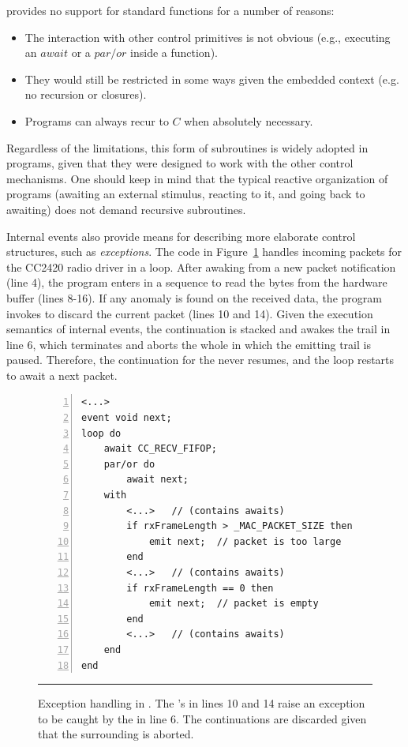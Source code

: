 \vspace{5pt}
\CEU provides no support for standard functions for a number of reasons:
\begin{itemize}
\item The interaction with other \CEU control primitives is not obvious (e.g., 
executing an $await$ or a $par/or$ inside a function).
\item They would still be restricted in some ways given the embedded context 
(e.g. no recursion or closures).
\item Programs can always recur to $C$ when absolutely necessary.
\end{itemize}

Regardless of the limitations, this form of subroutines is widely adopted in 
\CEU programs, given that they were designed to work with the other control 
mechanisms.
One should keep in mind that the typical reactive organization of programs 
(awaiting an external stimulus, reacting to it, and going back to awaiting) 
does not demand recursive subroutines.

Internal events also provide means for describing more elaborate control 
structures, such as \emph{exceptions}.
The code in Figure~\ref{lst.exception} handles incoming packets for the CC2420 
radio driver in a loop.
After awaking from a new packet notification (line 4), the program enters in a 
sequence to read the bytes from the hardware buffer (lines 8-16).
If any anomaly is found on the received data, the program invokes 
 to discard the current packet (lines 10 and 14).
Given the execution semantics of internal events, the  continuation 
is stacked and awakes the trail in line 6, which terminates and aborts the 
whole  in which the emitting trail is paused.
Therefore, the continuation for the  never resumes, and the loop 
restarts to await a next packet.


\begin{figure}[t]
\begin{lstlisting}[numbers=left,xleftmargin=2em]
<...>
event void next;
loop do
    await CC_RECV_FIFOP;
    par/or do
        await next;
    with
        <...>   // (contains awaits)
        if rxFrameLength > _MAC_PACKET_SIZE then
            emit next;  // packet is too large
        end
        <...>   // (contains awaits)
        if rxFrameLength == 0 then
            emit next;  // packet is empty
        end
        <...>   // (contains awaits)
    end
end
\end{lstlisting}
\rule{14cm}{0.37pt}
\caption{ Exception handling in \CEU. \newline
{\small
The 's in lines 10 and 14 raise an exception to be caught by the 
 in line 6.
The  continuations are discarded given that the surrounding 
 is aborted.
}
\label{lst.exception}
}
\end{figure}

